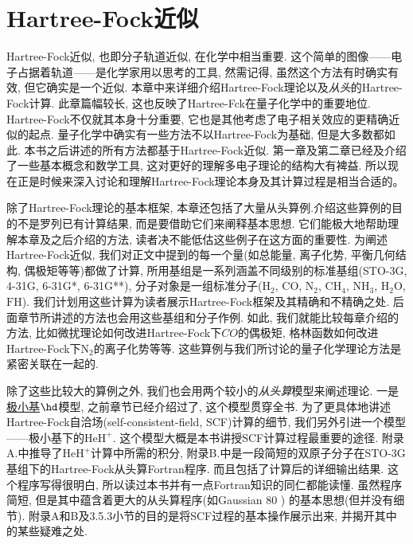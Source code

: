\chapter{Hartree-Fock近似}
Hartree-Fock近似, 也即分子轨道近似, 在化学中相当重要. 这个简单的图像——电子占据着轨道——是化学家用以思考的工具, 然需记得, 虽然这个方法有时确实有效, 但它确实是一个近似. 本章中来详细介绍Hartree-Fock理论以及\emph{从头}的Hartree-Fock计算. 此章篇幅较长, 这也反映了Hartree-Fck在量子化学中的重要地位. Hartree-Fock不仅就其本身十分重要, 它也是其他考虑了电子相关效应的更精确近似的起点. 量子化学中确实有一些方法不以Hartree-Fock为基础, 但是大多数都如此. 本书之后讲述的所有方法都基于Hartree-Fock近似. 第一章及第二章已经及介绍了一些基本概念和数学工具, 这对更好的理解多电子理论的结构大有裨益. 所以现在正是时候来深入讨论和理解Hartree-Fock理论本身及其计算过程是相当合适的。

除了Hartree-Fock理论的基本框架, 本章还包括了大量从头算例.介绍这些算例的目的不是罗列已有计算结果, 而是要借助它们来阐释基本思想. 它们能极大地帮助理解本章及之后介绍的方法, 读者决不能低估这些例子在这方面的重要性. 为阐述Hartree-Fock近似, 我们对正文中提到的每一个量(如总能量, 离子化势, 平衡几何结构, 偶极矩等等)都做了计算, 所用基组是一系列涵盖不同级别的标准基组(STO-3G, 4-31G, 6-31G*, 6-31G**), 分子对象是一组标准分子($\mathrm{H}_2$, $\mathrm{CO}$, $\mathrm{N}_2$, $\mathrm{CH}_4$, $\mathrm{NH}_3$, $\mathrm{H}_2\mathrm{O}$, $\mathrm{FH}$). 我们计划用这些计算为读者展示Hartree-Fock框架及其精确和不精确之处. 后面章节所讲述的方法也会用这些基组和分子作例. 如此, 我们就能比较每章介绍的方法, 比如微扰理论如何改进Hartree-Fock下$CO$的偶极矩, 格林函数如何改进Hartree-Fock下$\mathrm{N}_2$的离子化势等等. 这些算例与我们所讨论的量子化学理论方法是紧密关联在一起的.

除了这些比较大的算例之外, 我们也会用两个较小的\emph{从头算}模型来阐述理论. 一是\underline{极小基$\hd$}模型, 之前章节已经介绍过了, 这个模型贯穿全书. 为了更具体地讲述Hartree-Fock自洽场(self-consistent-field, SCF)计算的细节, 我们另外引进一个模型——极小基下的$\mathrm{HeH}^+$. 这个模型大概是本书讲授SCF计算过程最重要的途径. 附录A.中推导了$\mathrm{HeH}^+$计算中所需的积分, 附录B.中是一段简短的双原子分子在STO-3G基组下的Hartree-Fock从头算Fortran程序. 而且包括了计算后的详细输出结果. 这个程序写得很明白, 所以读过本书并有一点Fortran知识的同仁都能读懂. 虽然程序简短, 但是其中蕴含着更大的从头算程序(如Gaussian 80
)
的基本思想(但并没有细节). 附录A和B及3.5.3小节的目的是将SCF过程的基本操作展示出来, 并揭开其中的某些疑难之处.

